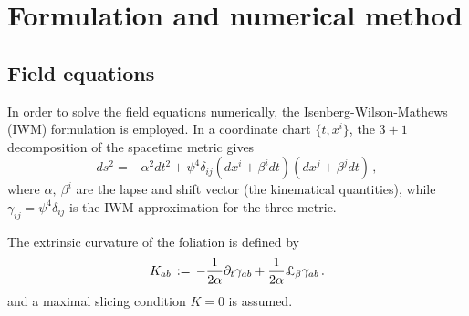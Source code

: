 \documentclass[twocolumn,superscriptaddress,showpacs,prd,aps,amsmath,amssymb,nofootinbib]{revtex4-1}
\begin{document}
\section{Formulation and numerical method}
\label{sec:formandmethod}
\subsection{Field equations}
\label{sec:IWMformulation}

In order to solve the field equations numerically, the
Isenberg-Wilson-Mathews (IWM) formulation
\cite{Isenberg1980,Isenberg08,Wilson89} is employed. In a coordinate
chart $\{t,x^i\}$, the $\mathrm{3+1}$ decomposition of the spacetime
metric gives
%
\begin{equation} 
ds^2 = -\alpha^2 dt^2 + \psi^4 \delta_{ij}
(dx^{i}+\beta^{i}dt) (dx^{j}+\beta^{j}dt)\,, 
\end{equation} 
%
where $\alpha,\ \beta^i$ are the lapse and shift vector (the kinematical
quantities), while $\gamma_{ij}=\psi^4\delta_{ij}$ is the IWM
approximation for the three-metric.

The extrinsic curvature of the foliation is defined by 
\begin{equation}
\Kabd 
\,:=\,-\frac1{2\alpha}\pa_t \gmabd +\frac1{2\alpha}\Lie_\beta \gmabd\,. 
\end{equation}
and a maximal slicing condition $K=0$ is assumed.
\end{document}
